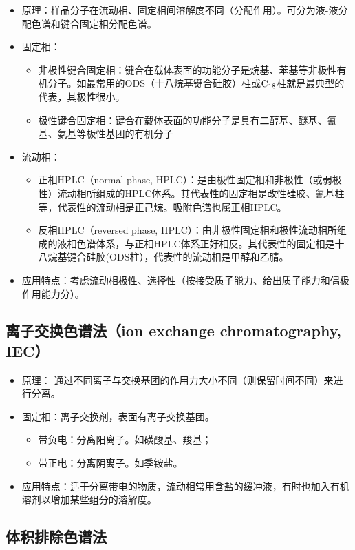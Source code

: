 \begin{itemize}
	\item 原理：样品分子在流动相、固定相间溶解度不同（分配作用）。可分为液-液分配色谱和键合固定相分配色谱。
	\item 固定相：
	\begin{itemize}
		\item 非极性键合固定相：键合在载体表面的功能分子是烷基、苯基等非极性有机分子。如最常用的ODS（十八烷基键合硅胶）柱或$\ce{C18}$柱就是最典型的代表，其极性很小。
		\item 极性键合固定相：键合在载体表面的功能分子是具有二醇基、醚基、氰基、氨基等极性基团的有机分子
	\end{itemize}
	\item 流动相：
	\begin{itemize}
		\item 正相HPLC（normal  phase, HPLC）：是由极性固定相和非极性（或弱极性）流动相所组成的HPLC体系。其代表性的固定相是改性硅胶、氰基柱等，代表性的流动相是正己烷。吸附色谱也属正相HPLC。
		\item 反相HPLC（reversed phase, HPLC）：由非极性固定相和极性流动相所组成的液相色谱体系，与正相HPLC体系正好相反。其代表性的固定相是十八烷基键合硅胶(ODS柱），代表性的流动相是甲醇和乙腈。
	\end{itemize}
	\item 应用特点：考虑流动相极性、选择性（按接受质子能力、给出质子能力和偶极作用能力分）。
\end{itemize}

\subsection{离子交换色谱法（ion exchange chromatography, IEC）}
\begin{itemize}
	\item 原理： 通过不同离子与交换基团的作用力大小不同（则保留时间不同）来进行分离。
	\item 固定相：离子交换剂，表面有离子交换基团。
	\begin{itemize}
		\item 带负电：分离阳离子。如磺酸基、羧基；
		\item 带正电：分离阴离子。如季铵盐。
	\end{itemize}
	\item 应用特点：适于分离带电的物质，流动相常用含盐的缓冲液，有时也加入有机溶剂以增加某些组分的溶解度。
\end{itemize}



\subsection{体积排除色谱法}

\section{}





